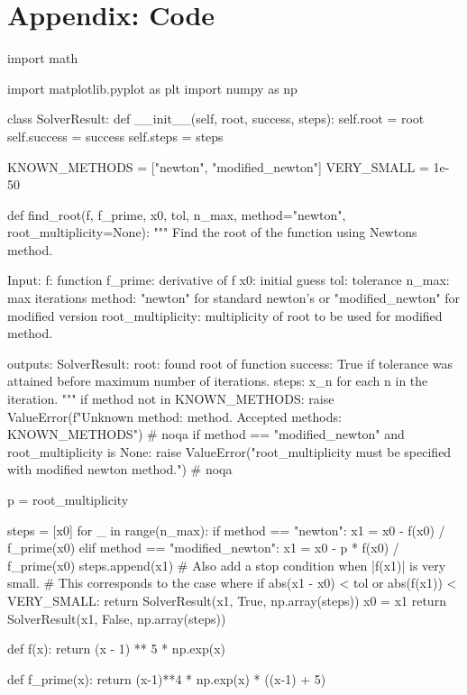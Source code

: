 \documentclass{homework}
\begin{document}
\section{Appendix: Code}
\begin{python}
import math

import matplotlib.pyplot as plt
import numpy as np


class SolverResult:
    def __init__(self, root, success, steps):
        self.root = root
        self.success = success
        self.steps = steps


KNOWN_METHODS = ["newton", "modified_newton"]
VERY_SMALL = 1e-50

def find_root(f, f_prime, x0, tol, n_max, method="newton", root_multiplicity=None):
    """
    Find the root of the function using Newtons method.
    
    Input:
        f: function
        f_prime: derivative of f
        x0: initial guess
        tol: tolerance
        n_max: max iterations
        method: "newton" for standard newton's or "modified_newton" for modified
            version
        root_multiplicity: multiplicity of root to be used for modified method.

    outputs:
        SolverResult:
            root: found root of function
            success: True if tolerance was attained before maximum number of iterations.
            steps: x_n for each n in the iteration.
    """
    if method not in KNOWN_METHODS:
        raise ValueError(f"Unknown method: {method}. Accepted methods: {KNOWN_METHODS}")  # noqa
    if method == "modified_newton" and root_multiplicity is None:
        raise ValueError("root_multiplicity must be specified with modified newton method.") # noqa

    p = root_multiplicity

    steps = [x0]
    for _ in range(n_max):
        if method == "newton":
            x1 = x0 - f(x0) / f_prime(x0)
        elif method == "modified_newton":
            x1 = x0 - p * f(x0) / f_prime(x0)
        steps.append(x1)
        # Also add a stop condition when |f(x1)| is very small. 
        # This corresponds to the case where
        if abs(x1 - x0) < tol or abs(f(x1)) < VERY_SMALL:
            return SolverResult(x1, True, np.array(steps))
        x0 = x1
    return SolverResult(x1, False, np.array(steps))


def f(x):
    return (x - 1) ** 5 * np.exp(x)

def f_prime(x):
    return (x-1)**4 * np.exp(x) * ((x-1) + 5)


\end{python}
\end{document}

